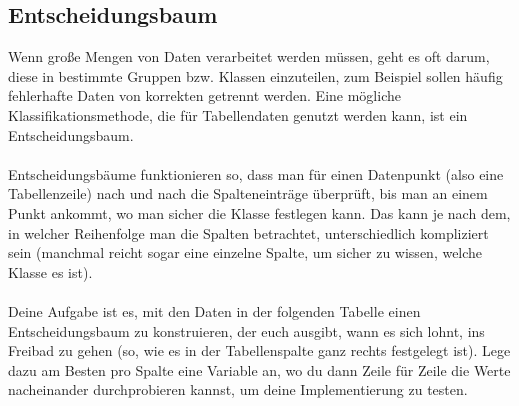 \subsection{Entscheidungsbaum}
Wenn große Mengen von Daten verarbeitet werden müssen, geht es oft darum, diese in bestimmte Gruppen bzw. Klassen einzuteilen, zum Beispiel sollen häufig fehlerhafte Daten von korrekten getrennt werden. Eine mögliche Klassifikationsmethode, die für Tabellendaten genutzt werden kann, ist ein Entscheidungsbaum.\\
\\
Entscheidungsbäume funktionieren so, dass man für einen Datenpunkt (also eine Tabellenzeile) nach und nach die Spalteneinträge überprüft, bis man an einem Punkt ankommt, wo man sicher die Klasse festlegen kann. Das kann je nach dem, in welcher Reihenfolge man die Spalten betrachtet, unterschiedlich kompliziert sein (manchmal reicht sogar eine einzelne Spalte, um sicher zu wissen, welche Klasse es ist).\\
\\
Deine Aufgabe ist es, mit den Daten in der folgenden Tabelle einen Entscheidungsbaum zu konstruieren, der euch ausgibt, wann es sich lohnt, ins Freibad zu gehen (so, wie es in der Tabellenspalte ganz rechts festgelegt ist). Lege dazu am Besten pro Spalte eine Variable an, wo du dann Zeile für Zeile die Werte nacheinander durchprobieren kannst, um deine Implementierung zu testen.
